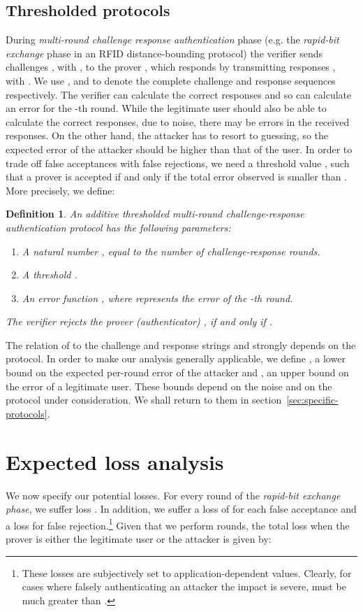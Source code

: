 \documentclass[a4paper]{article}
\theoremstyle{plain} \newtheorem{remark}{Remark}
\theoremstyle{plain} \newtheorem{definition}{Definition}
\theoremstyle{plain} \newtheorem{example}{Example}
\theoremstyle{plain} \newtheorem{assumption}{Assumption}
\theoremstyle{plain} \newtheorem{conjecture}{Conjecture}
\theoremstyle{plain} \newtheorem{theorem}{Theorem}
\theoremstyle{plain} \newtheorem{proposition}{Proposition}
\theoremstyle{plain} \newtheorem{lemma}{Lemma}
\theoremstyle{plain} \newtheorem{corollary}{Corollary}
\begin{document}
\subsection{Thresholded protocols}
\label{sec:thresholded-protocols}
During {\em multi-round challenge response authentication} phase
(e.g. the \textit{rapid-bit exchange} phase in an RFID
distance-bounding protocol) the verifier  sends  challenges
, with , to the prover , which
responds by transmitting  responses , with . We use , and  to
denote the complete challenge and response sequences respectively. The
verifier  can calculate the correct responses  and so
can calculate an error  for the -th round. While the
legitimate user  should also be able to calculate the correct
responses, due to noise, there may be errors in the received
responses. On the other hand, the attacker has to resort to guessing,
so the expected error of the attacker should be higher than that of
the user.  In order to trade off false acceptances with false
rejections, we need a threshold value , such that a prover is
accepted if and only if the total error observed is smaller than
. More precisely, we define:
\begin{definition}
  An additive thresholded multi-round challenge-response
  authentication protocol has the following parameters:
  \begin{enumerate}
  \item A natural number , equal to the number of
    challenge-response rounds.
  \item A threshold .
  \item An error function , where
     represents the error of the -th round.
  \end{enumerate}
  The verifier  rejects the prover (authenticator) ,
  if and only if .
  \label{def:thresholded-auth}
\end{definition}
The relation of  to the challenge and response strings  and
 strongly depends on the protocol.  In order to make our analysis
generally applicable, we define , a lower
bound on the expected per-round error of the attacker and , an upper bound on the error of a legitimate user.
These bounds depend on the noise and on the protocol under
consideration.  We shall return to them in
section~\ref{sec:specific-protocols}.

\section{Expected loss analysis}
\label{sec:loss-analysis}
We now specify our potential losses. For every round of the
\textit{rapid-bit exchange phase}, we suffer loss . In addition,
we suffer a loss of  for each false acceptance and a loss 
for false rejection.\footnote{These losses are subjectively set to
  application-dependent values. Clearly, for cases where falsely
  authenticating an attacker the impact is severe,  must be much
  greater than .} Given that we perform  rounds, the total
loss when the prover  is either the legitimate user  or the
attacker  is given by:
\end{document}
